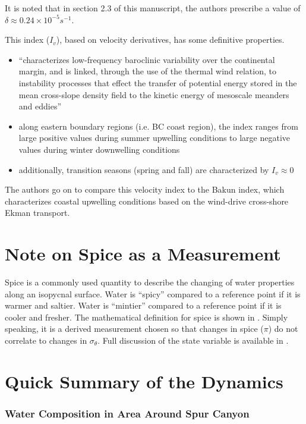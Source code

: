 \documentclass[12pt]{extreport}
\begin{document}
It is noted that in section 2.3 of this manuscript, the authors prescribe a value of $\delta \approx 0.24 \times 10^{-5} s^{-1}$.

This index ($I_v$), based on velocity derivatives, has some definitive properties.
\begin{itemize}
 \item ``characterizes low-frequency baroclinic variability over the continental margin, and is linked, through the use of the thermal wind relation, to instability processes that effect the transfer of potential energy stored in the mean cross-slope density field to the kinetic energy of mesoscale meanders and eddies''
 \item along eastern boundary regions (i.e. BC coast region), the index ranges from large positive values during summer upwelling conditions to large negative values during winter downwelling conditions
 \item additionally, transition seasons (spring and fall) are characterized by $I_v \approx 0$
\end{itemize}

The authors go on to compare this velocity index to the Bakun index, which characterizes coastal upwelling conditions based on the wind-drive cross-shore Ekman transport.


\section{Note on Spice as a Measurement}

Spice is a commonly used quantity to describe the changing of water properties along an isopycnal surface. Water is ``spicy'' compared to a reference point if it is warmer and saltier. Water is ``mintier'' compared to a reference point if it is cooler and fresher. The mathematical definition for spice is shown in \cite{flament2002state}. Simply speaking, it is a derived measurement chosen so that changes in spice ($\pi$) do not correlate to changes in $\sigma_\theta$. Full discussion of the state variable is available in \cite{flament2002state}.

\newpage
\section{Quick Summary of the Dynamics}

\subsubsection{Water Composition in Area Around Spur Canyon}
\end{document}
